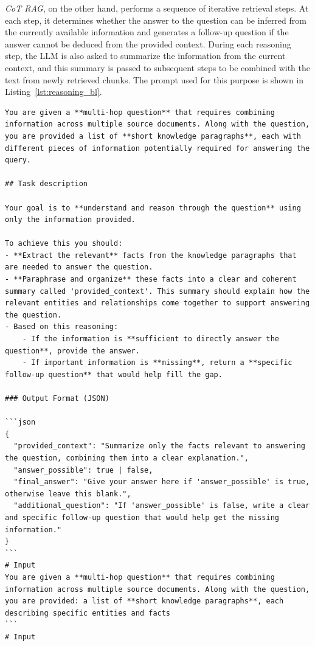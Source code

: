 \documentclass{article}
\begin{document}
\emph{CoT RAG}, on the other hand, performs a sequence of iterative retrieval steps. At each step, it determines whether the answer to the question can be inferred from the currently available information and generates a follow-up question if the answer cannot be deduced from the provided context. During each reasoning step, the LLM is also asked to summarize the information from the current context, and this summary is passed to subsequent steps to be combined with the text from newly retrieved chunks. The prompt used for this purpose is shown in Listing~\ref{lst:reasoning_bl}.

\begin{lstlisting}[style=baselinestyle, caption={Reasoning prompt for baseline systems}, label={lst:reasoning_bl}]
You are given a **multi-hop question** that requires combining information across multiple source documents. Along with the question, you are provided a list of **short knowledge paragraphs**, each with different pieces of information potentially required for answering the query.

## Task description

Your goal is to **understand and reason through the question** using only the information provided.

To achieve this you should:
- **Extract the relevant** facts from the knowledge paragraphs that are needed to answer the question.
- **Paraphrase and organize** these facts into a clear and coherent summary called 'provided_context'. This summary should explain how the relevant entities and relationships come together to support answering the question.
- Based on this reasoning:
    - If the information is **sufficient to directly answer the question**, provide the answer.
    - If important information is **missing**, return a **specific follow-up question** that would help fill the gap.

### Output Format (JSON)

```json
{
  "provided_context": "Summarize only the facts relevant to answering the question, combining them into a clear explanation.",
  "answer_possible": true | false,
  "final_answer": "Give your answer here if 'answer_possible' is true, otherwise leave this blank.",
  "additional_question": "If 'answer_possible' is false, write a clear and specific follow-up question that would help get the missing information."
}
```
# Input
You are given a **multi-hop question** that requires combining information across multiple source documents. Along with the question, you are provided: a list of **short knowledge paragraphs**, each describing specific entities and facts
```
# Input
\end{lstlisting}
\end{document}
